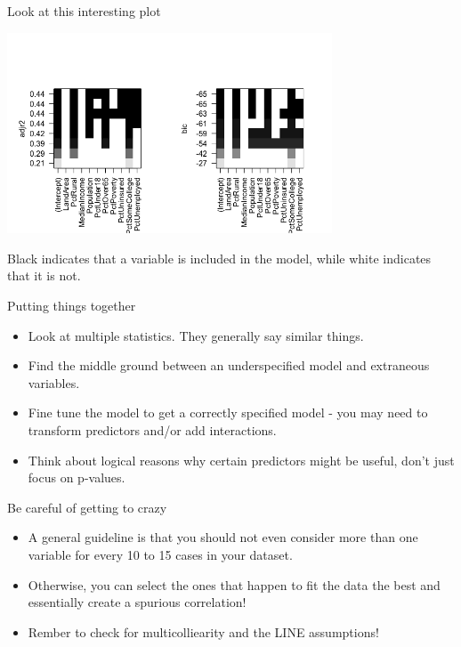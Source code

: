 \documentclass{beamer}\usepackage[]{graphicx}\usepackage[]{color}
\begin{document}
\begin{darkframes}
    \begin{frame}{Look at this interesting plot}
      \begin{center}
        \includegraphics[width=3.8in]{bestsubsets} \\
      \end{center} 

      \begin{center}
        {Black indicates that a variable is included in the model, while white indicates that it is not.}
      \end{center} 
      
    \end{frame}


    \begin{frame}[fragile]{Putting things together}
      \begin{itemize}[<+->]
        \item Look at multiple statistics. They generally say similar things.
        \item Find the middle ground between an underspecified model and extraneous variables.
        \item Fine tune the model to get a correctly specified model - you may need to transform predictors and/or add interactions.
        \item Think about logical reasons why certain predictors might be useful, don't just focus on p-values.
      \end{itemize} 
    \end{frame}


    \begin{frame}[fragile]{Be careful of getting to crazy}
      \begin{itemize}[<+->]
        \item A general guideline is that you should not even consider more than one variable for every 10 to 15 cases in your dataset. 
        \item Otherwise, you can select the ones that happen to fit the data the best and essentially create a spurious correlation!
        \item Rember to check for multicolliearity and the LINE assumptions!
      \end{itemize} 
    \end{frame}


  \end{darkframes}
\end{document}
